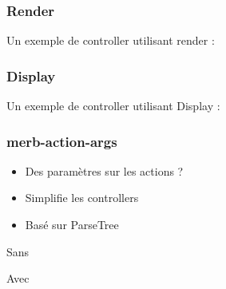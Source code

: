 \documentclass{beamer}
\begin{document}
\begin{frame}
    \frametitle{Render}

    Un exemple de controller utilisant render :

    \begin{center}
        
    \end{center}
\end{frame}

\begin{frame}
    \frametitle{Display}

    Un exemple de controller utilisant Display :


    \begin{center}
        
    \end{center}
\end{frame}

\begin{frame}
    \frametitle{merb-action-args}

    \begin{itemize}
        \item Des paramètres sur les actions ?
        \item Simplifie les controllers
        \item Basé sur ParseTree
    \end{itemize}
\end{frame}

\begin{frame}
    Sans
            

    Avec
            
\end{frame}
\end{document}
